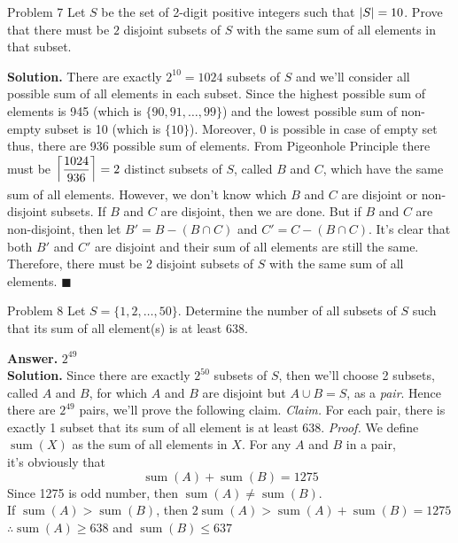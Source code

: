 \documentclass[12pt]{article}
\DeclarePairedDelimiter{\ceil}{\lceil}{\rceil}
\begin{document}
\newpage
\begin{mybox}{Problem 7}
 Let $S$ be the set of 2-digit positive integers such that $\left\lvert S \right\rvert = 10$. Prove that there must be $2$ disjoint subsets of $S$ with the same sum of all elements in that subset.
\end{mybox}
\textbf{Solution.} There are exactly $2^{10}=1024$ subsets of $S$ and we'll consider all possible sum of all elements in each subset. Since the highest possible sum of elements is 945 (which is $\{90,91,\dots,99\}$) and the lowest possible sum of non-empty subset is 10 (which is $\{10\}$). Moreover, 0 is possible in case of empty set thus, there are 936 possible sum of elements.\newline
\newline
From Pigeonhole Principle there must be $\ceil[\bigg]{\dfrac{1024}{936}}=2$ distinct subsets of $S$, called $B$ and $C$, which have the same sum of all elements. However, we don't know which $B$ and $C$ are disjoint or non-disjoint subsets. If $B$ and $C$ are disjoint, then we are done. But if $B$ and $C$ are non-disjoint, then let $B' = B - (B\cap C)$ and $C' = C - (B\cap C)$. It's clear that both $B'$ and $C'$ are disjoint and their sum of all elements are still the same. \newline
Therefore, there must be 2 disjoint subsets of $S$ with the same sum of all elements. \null\hfill $\blacksquare$
\newpage
\begin{mybox}{Problem 8}
Let $S=\{1,2,\dots,50\}$. Determine the number of all subsets of $S$ such that its sum of all element(s) is at least 638.
\end{mybox}
\textbf{Answer.} $2^{49}$\\
\textbf{Solution.} Since there are exactly $2^{50}$ subsets of $S$, then we'll choose 2 subsets, called $A$ and $B$, for which $A$ and $B$ are disjoint but $A \cup B = S$, as a \emph{pair}. Hence there are $2^{49}$ pairs, we'll prove the following claim.
\newline
\emph{Claim.} For each pair, there is exactly 1 subset that its sum of all element is at least 638. \newline
\emph{Proof.} We define $\operatorname{sum}(X)$ as the sum of all elements in $X$. For any $A$ and $B$ in a pair, \\ it's obviously that $$\operatorname{sum}(A) + \operatorname{sum}(B) = 1275$$
Since 1275 is odd number, then $\operatorname{sum}(A) \neq \operatorname{sum}(B)$.\\
If $\operatorname{sum}(A) > \operatorname{sum}(B)$, then $2\operatorname{sum}(A) > \operatorname{sum}(A) + \operatorname{sum}(B) = 1275$ $\therefore \operatorname{sum}(A) \geq 638$ and $\operatorname{sum}(B) \leq 637$ \newline
\end{document}
